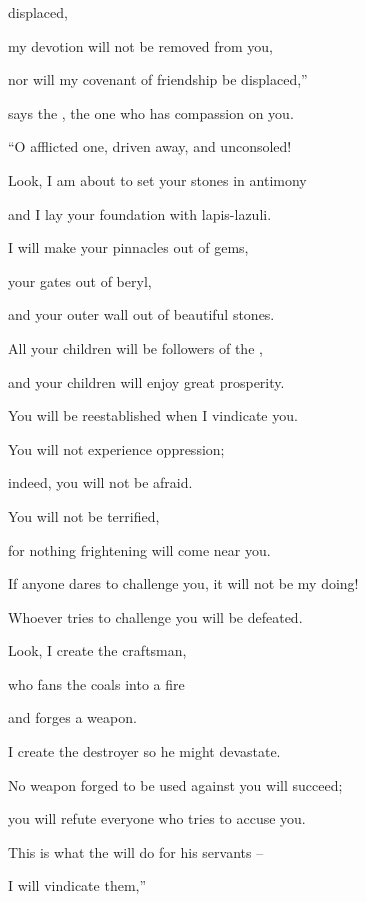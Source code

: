 {displaced,
\par }{\Q my devotion
will not
be
removed
from you,
\par }{\Q nor will my covenant
of friendship
be displaced,”
\par }{\Q says
the {}, the one who has compassion on you.
\par }{\Q {}“O afflicted
one, driven away, and unconsoled!
\par }{\Q Look,
I am
about to set your stones
in antimony
\par }{\Q and I lay
your foundation
with lapis-lazuli.
\par }{\Q {}I will make
your pinnacles
out of gems,
\par }{\Q your gates out
of beryl,
\par }{\Q and your outer
wall out
of beautiful
stones.
\par }{\Q {}All
your children
will be followers
of the {},
\par }{\Q and your children will enjoy great
prosperity.
\par }{\Q {}You will be reestablished when I
vindicate
you.

\par }{\Q You will not experience oppression;
\par }{\Q indeed,
you will not
be afraid.
\par }{\Q You will not be terrified,

\par }{\Q for
nothing frightening
will come near you.
\par }{\Q {}If
anyone dares
to challenge
you, it will not
be my doing!
\par }{\Q Whoever
tries
to challenge
you
will
be defeated.
\par }{\Q {}Look,
I
create
the craftsman,
\par }{\Q who fans
the coals
into a fire
\par }{\Q and forges
a weapon.
\par }{\Q I
create
the destroyer
so he might devastate.
\par }{\Q {}No
weapon
forged
to be used
against
you will succeed;
\par }{\Q you will refute
everyone
who tries
to accuse
you.

\par }{\Q This
is what the
{}
will do for his servants
–
\par }{\Q I will vindicate
them,”

}
